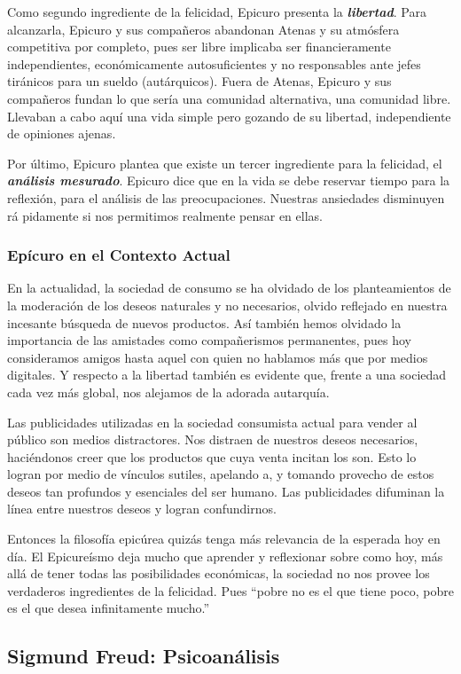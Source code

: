 \documentclass{article}
\begin{document}
Como segundo ingrediente de la felicidad, Epicuro presenta la \textit{\textbf{libertad}}. Para alcanzarla, Epicuro y sus compañeros abandonan Atenas y su atmósfera competitiva por completo, pues ser libre implicaba ser financieramente independientes, económicamente autosuficientes y no responsables ante jefes tiránicos para un sueldo (autárquicos). Fuera de Atenas, Epicuro y sus compañeros fundan lo que sería una comunidad alternativa, una comunidad libre. Llevaban a cabo aquí una vida simple pero gozando de su libertad, independiente de opiniones ajenas.

Por último, Epicuro plantea que existe un tercer ingrediente para la felicidad, el \textit{\textbf{análisis mesurado}}. Epicuro dice que en la vida se debe reservar tiempo para la reflexión, para el análisis de las preocupaciones. Nuestras ansiedades disminuyen rá    pidamente si nos permitimos realmente pensar en ellas.

\subsubsection{Epícuro en el Contexto Actual}

En la actualidad, la sociedad de consumo se ha olvidado de los planteamientos de la moderación de los deseos naturales y no necesarios, olvido reflejado en nuestra incesante búsqueda de nuevos productos. Así también hemos olvidado la importancia de las amistades como compañerismos permanentes, pues hoy consideramos amigos hasta aquel con quien no hablamos más que por medios digitales. Y respecto a la libertad también es evidente que, frente a una sociedad cada vez más global, nos alejamos de la adorada autarquía.

Las publicidades utilizadas en la sociedad consumista actual para vender al público son medios distractores. Nos distraen de nuestros deseos necesarios, haciéndonos creer que los productos que cuya venta incitan los son. Esto lo logran por medio de vínculos sutiles, apelando a, y tomando provecho de estos deseos tan profundos y esenciales del ser humano. Las publicidades difuminan la línea entre nuestros deseos y logran confundirnos.

Entonces la filosofía epicúrea quizás tenga más relevancia de la esperada hoy en día. El Epicureísmo deja mucho que aprender y reflexionar sobre como hoy, más allá de tener todas las posibilidades económicas, la sociedad no nos provee los verdaderos ingredientes de la felicidad. Pues ``pobre no es el que tiene poco, pobre es el que desea infinitamente mucho.'' 

\subsection{Sigmund Freud: Psicoanálisis}
\end{document}
